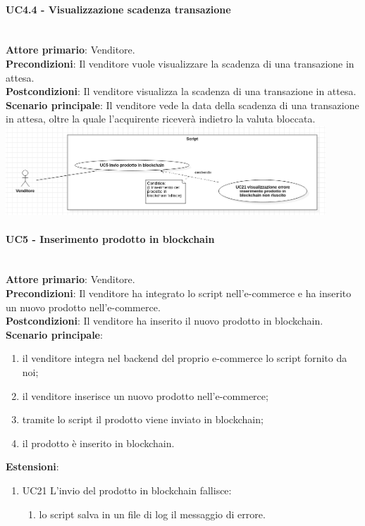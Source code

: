 \documentclass[a4paper, 12pt]{article}
\begin{document}
\paragraph{UC4.4 - Visualizzazione scadenza transazione}\\
\textbf{Attore primario}: Venditore.\\
\textbf{Precondizioni}: Il venditore vuole visualizzare la scadenza di una transazione in attesa.\\
\textbf{Postcondizioni}: Il venditore visualizza la scadenza di una transazione in attesa.\\
\textbf{Scenario principale}: Il venditore vede la data della scadenza di una transazione in attesa, oltre la quale l'acquirente riceverà indietro la valuta bloccata.\\

\includegraphics[width=0.9\textwidth]{UseCase_script1}

\paragraph{UC5 - Inserimento prodotto in blockchain}\\
\textbf{Attore primario}: Venditore.\\
\textbf{Precondizioni}: Il venditore ha integrato lo script nell'e-commerce e ha inserito un nuovo prodotto nell'e-commerce.\\
\textbf{Postcondizioni}: Il venditore ha inserito il nuovo prodotto in blockchain.\\
\textbf{Scenario principale}:
\begin{enumerate}
    \item il venditore integra nel backend del proprio e-commerce lo script fornito da noi;
    \item il venditore inserisce un nuovo prodotto nell'e-commerce;
    \item tramite lo script il prodotto viene inviato in blockchain;
    \item il prodotto è inserito in blockchain.
\end{enumerate}
\textbf{Estensioni}:
\begin{enumerate}
    \item UC21 L'invio del prodotto in blockchain fallisce:
    \begin{enumerate}
        \item lo script salva in un file di log il messaggio di errore.
    \end{enumerate}
\end{enumerate}
\end{document}

